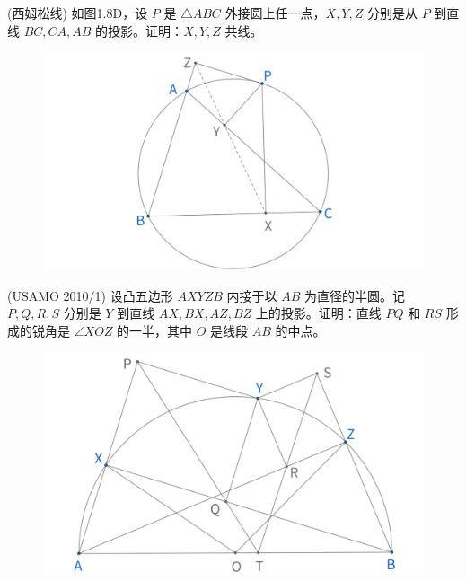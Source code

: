 \newpage 
\begin{exercise}
(西姆松线) 如图1.8D，设 $P$ 是 $\triangle ABC$ 外接圆上任一点，$X, Y, Z$ 分别是从 $P$ 到直线 $BC, CA, AB$ 的投影。证明：$X, Y, Z$ 共线。
\end{exercise}
\begin{figure}[H]
    \centering
    \includegraphics[width=0.7\linewidth]{figures/exercises/013.png}
\end{figure}

\begin{exercise}
(USAMO 2010/1) 设凸五边形 $AXYZB$ 内接于以 $AB$ 为直径的半圆。记 $P, Q, R, S$ 分别是 $Y$ 到直线 $AX, BX, AZ, BZ$ 上的投影。证明：直线 $PQ$ 和 $RS$ 形成的锐角是 $\angle XOZ$ 的一半，其中 $O$ 是线段 $AB$ 的中点。
\end{exercise}
\begin{figure}[H]
    \centering
    \includegraphics[width=0.7\linewidth]{figures/exercises/014.png}
\end{figure}


